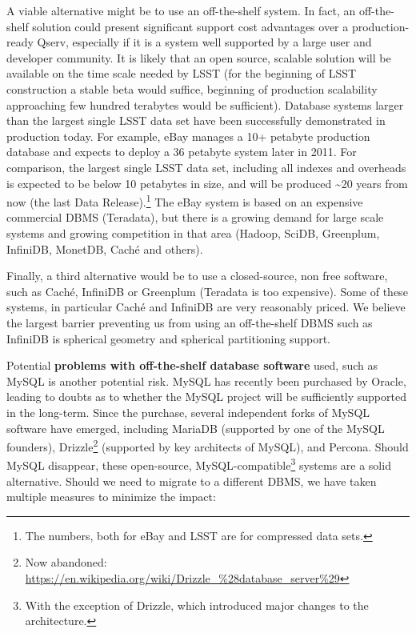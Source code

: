 \documentclass[DM,lsstdraft,toc]{lsstdoc}
\begin{document}
A viable alternative might be to use an off-the-shelf system. In fact,
an off-the-shelf solution could present significant support cost
advantages over a production-ready Qserv, especially if it is a system
well supported by a large user and developer community. It is likely
that an open source, scalable solution will be available on the time
scale needed by LSST (for the beginning of LSST construction a stable
beta would suffice, beginning of production scalability approaching few
hundred terabytes would be sufficient). Database systems larger than the
largest single LSST data set have been successfully demonstrated in
production today. For example, eBay manages a 10+ petabyte production
database \citep{Monash:2010:ebay} and expects to deploy a 36 petabyte system
later in 2011. For comparison, the largest single LSST data set,
including all indexes and overheads is expected to be below 10 petabytes
in size, and will be produced \textasciitilde{}20 years from now (the
last Data Release).\footnote{The numbers, both for eBay and LSST are for
  compressed data sets.} The eBay system is based on an expensive
commercial DBMS (Teradata), but there is a growing demand for large
scale systems and growing competition in that area (Hadoop, SciDB,
Greenplum, InfiniDB, MonetDB, Caché and others).

Finally, a third alternative would be to use a closed-source, non free
software, such as Caché, InfiniDB or Greenplum (Teradata is too
expensive). Some of these systems, in particular Caché and InfiniDB are
very reasonably priced. We believe the largest barrier preventing us
from using an off-the-shelf DBMS such as InfiniDB is spherical geometry
and spherical partitioning support.

Potential \textbf{problems with off-the-shelf database software} used,
such as MySQL is another potential risk. MySQL has recently been
purchased by Oracle, leading to doubts as to whether the MySQL project
will be sufficiently supported in the long-term. Since the purchase,
several independent forks of MySQL software have emerged, including
MariaDB (supported by one of the MySQL founders),
Drizzle\footnote{Now abandoned:
\url{https://en.wikipedia.org/wiki/Drizzle_\%28database_server\%29}}
(supported by key architects of
MySQL), and Percona. Should MySQL disappear, these open-source,
MySQL-compatible\footnote{With the exception of
  Drizzle, which introduced major changes to
  the architecture.} systems are a solid alternative. Should we need to
migrate to a different DBMS, we have taken multiple measures to minimize
the impact:
\end{document}
